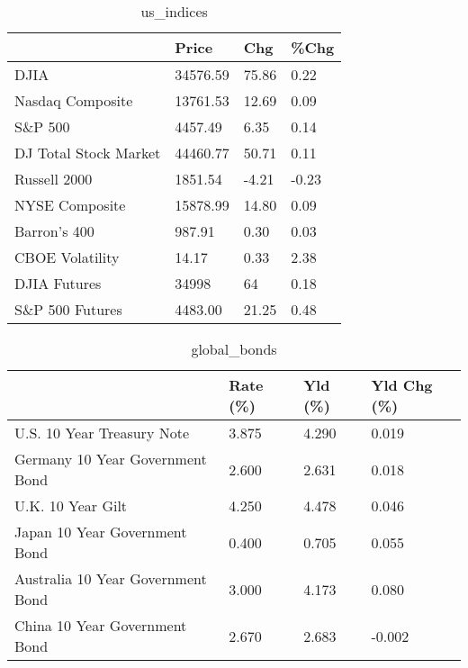 \documentclass{article}%
\begin{document}
%


\begin{table}[htbp]%
\caption{us\_indices}%
\centering%
\begin{adjustbox}{width=1\textwidth}%
\begin{tabular}{llll}
\toprule
                      &    Price &   Chg &  \%Chg \\
\midrule
                 DJIA & 34576.59 & 75.86 &  0.22 \\
     Nasdaq Composite & 13761.53 & 12.69 &  0.09 \\
              S\&P 500 &  4457.49 &  6.35 &  0.14 \\
DJ Total Stock Market & 44460.77 & 50.71 &  0.11 \\
         Russell 2000 &  1851.54 & -4.21 & -0.23 \\
       NYSE Composite & 15878.99 & 14.80 &  0.09 \\
         Barron's 400 &   987.91 &  0.30 &  0.03 \\
      CBOE Volatility &    14.17 &  0.33 &  2.38 \\
         DJIA Futures &    34998 &    64 &  0.18 \\
      S\&P 500 Futures &  4483.00 & 21.25 &  0.48 \\
\bottomrule
\end{tabular}
%
\end{adjustbox}%
\end{table}

%


\begin{table}[htbp]%
\caption{global\_bonds}%
\centering%
\begin{adjustbox}{width=1\textwidth}%
\begin{tabular}{llll}
\toprule
                                  & Rate (\%) & Yld (\%) & Yld Chg (\%) \\
\midrule
       U.S. 10 Year Treasury Note &    3.875 &   4.290 &       0.019 \\
  Germany 10 Year Government Bond &    2.600 &   2.631 &       0.018 \\
                U.K. 10 Year Gilt &    4.250 &   4.478 &       0.046 \\
    Japan 10 Year Government Bond &    0.400 &   0.705 &       0.055 \\
Australia 10 Year Government Bond &    3.000 &   4.173 &       0.080 \\
    China 10 Year Government Bond &    2.670 &   2.683 &      -0.002 \\
\bottomrule
\end{tabular}
%
\end{adjustbox}%
\end{table}
\end{document}
